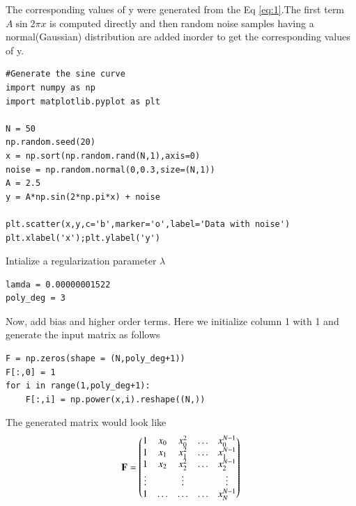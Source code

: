 \documentclass[journal,12pt,twocolumn]{IEEEtran}
\begin{document}
The corresponding values of y were generated from the Eq \eqref{eq:1}.The first term $A\sin{2\pi x}$ is computed directly and then random noise samples having a normal(Gaussian) distribution are added inorder to get the corresponding values of y.
\begin{lstlisting}
#Generate the sine curve 
import numpy as np
import matplotlib.pyplot as plt

N = 50
np.random.seed(20)
x = np.sort(np.random.rand(N,1),axis=0)
noise = np.random.normal(0,0.3,size=(N,1))
A = 2.5
y = A*np.sin(2*np.pi*x) + noise

plt.scatter(x,y,c='b',marker='o',label='Data with noise')
plt.xlabel('x');plt.ylabel('y')
\end{lstlisting}
Intialize a regularization parameter $\lambda$ 
\begin{lstlisting}
lamda = 0.00000001522 
poly_deg = 3
\end{lstlisting}
Now, add bias and higher order terms. Here we initialize column 1 with 1 and generate the input matrix as follows
\begin{lstlisting}
F = np.zeros(shape = (N,poly_deg+1))
F[:,0] = 1
for i in range(1,poly_deg+1):
    F[:,i] = np.power(x,i).reshape((N,))    
\end{lstlisting}
The generated matrix would look like
\begin{align}
    \mathbf{F}= \begin{pmatrix} 1 & x_{0} & x_{0}^2 & \ldots & x_{0}^{N-1} \\
		1 & x_{1} & x_{1}^2 & \ldots & x_{1}^{N-1} \\
		1 & x_{2} & x_{2}^2 & \ldots & x_{2}^{N-1} \\
		\vdots & & \vdots &  & \vdots  \\
		    1 & \ldots & \ldots & \ldots & x_{N}^{N-1} \end{pmatrix}\label{eq:12}
\end{align}
\end{document}
